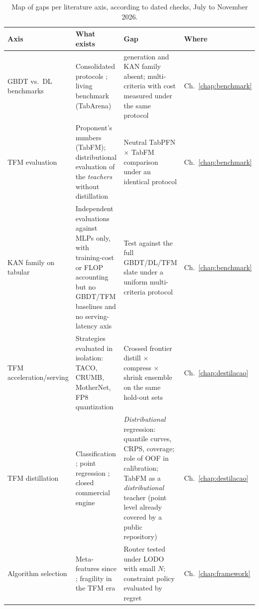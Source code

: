 \begin{table}[htbp]
\centering
\caption[Map of gaps per literature axis]{Map of gaps per literature
axis, according to dated checks, July to November 2026.}
\label{tab:lacunas}
\small
\begin{tabular}{>{\raggedright\arraybackslash}p{}>{\raggedright\arraybackslash}p{}>{\raggedright\arraybackslash}p{}>{\raggedright\arraybackslash}p{}}
\toprule
\textbf{Axis} & \textbf{What exists} & \textbf{Gap} & \textbf{Where} \\
\midrule
GBDT vs.\ DL benchmarks &
Consolidated protocols \citep{grinsztajn2022,mcelfresh2023,gorishniy2021};
living benchmark (TabArena) &
2026 generation and KAN family absent; multi-criteria with cost
measured under the same protocol &
Ch.~\ref{chap:benchmark} \\
\addlinespace
TFM evaluation &
Proponent's numbers (TabFM); distributional evaluation of the
\emph{teachers} without distillation
\citep{izbicki2026,landsgesell2026,scoringbench2026} &
Neutral TabPFN $\times$ TabFM comparison under an identical protocol &
Ch.~\ref{chap:benchmark} \\
\addlinespace
KAN family on tabular &
Independent evaluations against MLPs only, with training-cost or
FLOP accounting but no GBDT/TFM baselines and no serving-latency
axis \citep{poeta2024,kancritical2024} &
Test against the full GBDT/DL/TFM slate under a uniform
multi-criteria protocol &
Ch.~\ref{chap:benchmark} \\
\addlinespace
TFM acceleration/\allowbreak serving &
Strategies evaluated in isolation: TACO, CRUMB, MotherNet, FP8
quantization \citep{taco2026,crumb2026,mothernet2023,kubler2026} &
Crossed frontier distill $\times$ compress $\times$ shrink ensemble
on the same hold-out sets &
Ch.~\ref{chap:destilacao} \\
\addlinespace
TFM distillation &
Classification \citep{pocketfm2026,pocketfmhealth2026,gear2026};
point regression \citep{jeong2026,dey2026}; closed commercial
engine \citep{priorlabs2025} &
\emph{Distributional} regression: quantile curves, CRPS, coverage;
role of OOF in calibration; TabFM as a \emph{distributional} teacher
(point level already covered by a public repository) &
Ch.~\ref{chap:destilacao} \\
\addlinespace
Algorithm selection &
Meta-features since \citet{rice1976}; fragility in the TFM era
\citep{herre2026} &
Router tested under LODO with small $N$; constraint policy
evaluated by regret &
Ch.~\ref{chap:framework} \\
\bottomrule
\end{tabular}
\end{table}

